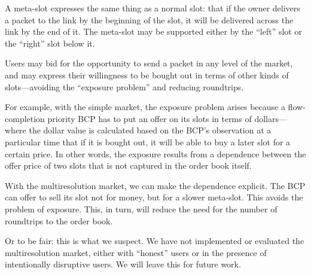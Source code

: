 A meta-slot expresses the same thing as a normal slot: that if the
owner delivers a packet to the link by the beginning of the slot, it
will be delivered across the link by the end of it. The meta-slot may
be supported either by the ``left'' slot or the ``right'' slot below
it.

Users may bid for the opportunity to send a packet in any level of the
market, and may express their willingness to be bought out in terms of
other kinds of slots---avoiding the ``exposure problem'' and reducing
roundtrips.

For example, with the simple market, the exposure problem arises
because a flow-completion priority BCP has to put an offer on its
slots in terms of dollars---where the dollar value is calculated based
on the BCP's observation at a particular time that if it is bought
out, it will be able to buy a later slot for a certain price. In other
words, the exposure results from a dependence between the offer price
of two slots that is not captured in the order book itself.

With the multiresolution market, we can make the dependence
explicit. The BCP can offer to sell its slot not for money, but for a
slower meta-slot. This avoids the problem of exposure. This, in turn,
will reduce the need for the number of roundtrips to the order
book.

Or to be fair: this is what we suspect. We have not implemented or
evaluated the multiresolution market, either with ``honest'' users or
in the presence of intentionally disruptive users. We will leave this
for future work.
